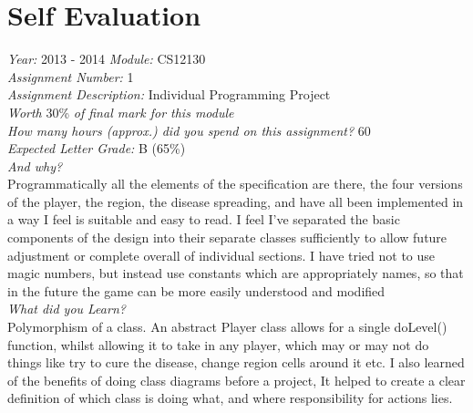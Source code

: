 \documentclass[pdftex,12pt,a4paper]{article}
\begin{document}
	
	\tableofcontents
	\newpage
	\pagestyle{plain}

	\section{Self Evaluation}
	\emph{Year:} 2013 - 2014
	\emph{Module:}     CS12130\\
	\emph{Assignment Number:}         1\\
	\emph{Assignment Description:}   Individual Programming Project\\
	\emph{Worth} 30\% \emph{of final mark for this module}\\
	\emph{How many hours (approx.) did you spend on this assignment?} 60\\
	\emph{Expected Letter Grade:} B (65\%)\\
	\emph{And why?}\\
	Programmatically all the elements of the specification are there, the four versions of the player, the region, the disease spreading, and have all been implemented in a way I feel is suitable and easy to read. I feel I've separated the basic components of the design into their separate classes sufficiently to allow future adjustment or complete overall of individual sections. I have tried not to use magic numbers, but instead use constants which are appropriately names, so that in the future the game can be more easily understood and modified 
	\\\emph{What did you Learn?}\\
	Polymorphism of a class. An abstract Player class allows for a single doLevel() function, whilst allowing it to take in any player, which may or may not do things like try to cure the disease, change region cells around it etc. I also learned of the benefits of doing class diagrams before a project, It helped to create a clear definition of which class is doing what, and where responsibility for actions lies. 
\end{document}
